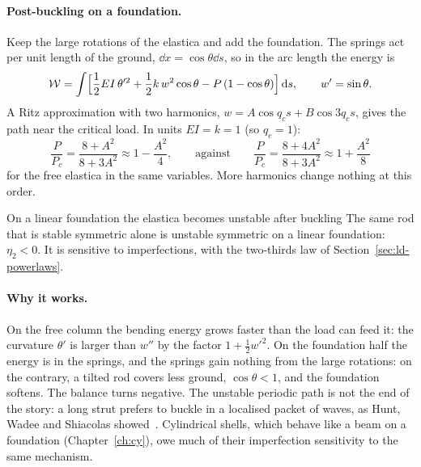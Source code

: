 \paragraph{Post-buckling on a foundation.}
%
Keep the large rotations of the elastica and add the foundation. The springs act per unit
length of the ground, $\dd x = \cos\theta\dd s$, so in the arc length the energy is
\begin{equation}\label{eq:rd-foundation-energy}
  \mathcal{W} = \int \Bigl[\frac12 EI\,\theta'^2 + \frac12 k\,w^2\cos\theta - P\,(1 - \cos\theta)\Bigr]\,\mathrm{d} s,
  \qquad w' = \sin\theta .
\end{equation}
A Ritz approximation with two harmonics, $w = A\cos q_cs + B\cos 3q_cs$, gives the path near the
critical load. In units $EI = k = 1$ (so $q_c = 1$):
\begin{equation}\label{eq:rd-foundation-path}
  \frac{P}{P_c} = \frac{8 + A^2}{8 + 3A^2} \approx 1 - \frac{A^2}{4},
  \qquad\text{against}\qquad
  \frac{P}{P_c} = \frac{8 + 4A^2}{8 + 3A^2} \approx 1 + \frac{A^2}{8}
\end{equation}
for the free elastica in the same variables. More harmonics change nothing at this order.

\begin{gbox}{On a linear foundation the elastica becomes unstable after buckling}\label{sec:rd-foundation-unstable}
%
The same rod that is stable symmetric alone is unstable symmetric on a linear foundation:
$\eta_2 < 0$. It is sensitive to imperfections, with the two-thirds law of
Section~\ref{sec:ld-powerlaws}.
\end{gbox}

\paragraph{Why it works.}
On the free column the bending energy grows faster than the load can feed it: the curvature
$\theta'$ is larger than $w''$ by the factor $1 + \tfrac12 w'^2$. On the foundation half the energy is
in the springs, and the springs gain nothing from the large rotations: on the contrary, a
tilted rod covers less ground, $\cos\theta < 1$, and the foundation softens. The balance turns
negative. The unstable periodic path is not the end of the story: a long strut prefers to
buckle in a localised packet of waves, as Hunt, Wadee and Shiacolas
showed~\cite{rd-hunt1993}. Cylindrical shells, which behave like a beam on a foundation
(Chapter~\ref{ch:cy}), owe much of their imperfection sensitivity to the same mechanism.

